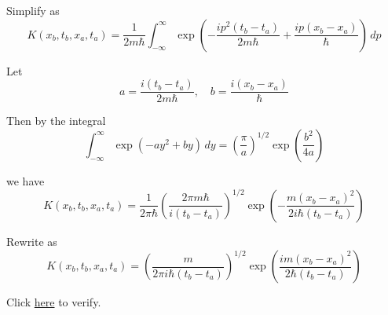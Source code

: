 Simplify as
\begin{equation*}
K(x_b,t_b,x_a,t_a)=\frac{1}{2m\hbar}\int_{-\infty}^\infty
\exp\left(-\frac{ip^2(t_b-t_a)}{2m\hbar}+\frac{ip(x_b-x_a)}{\hbar}\right)\,dp
\end{equation*}

Let
\begin{equation*}
a=\frac{i(t_b-t_a)}{2m\hbar},\quad b=\frac{i(x_b-x_a)}{\hbar}
\end{equation*}

Then by the integral
\begin{equation*}
\int_{-\infty}^\infty
\exp\left(-ay^2+by\right)\,dy=\left(\frac{\pi}{a}\right)^{1/2}\exp\left(\frac{b^2}{4a}\right)
\end{equation*}

we have
\begin{equation*}
K(x_b,t_b,x_a,t_a)=\frac{1}{2\pi\hbar}
\left(\frac{2\pi m\hbar}{i(t_b-t_a)}\right)^{1/2}
\exp\left(-\frac{m(x_b-x_a)^2}{2i\hbar(t_b-t_a)}\right)
\end{equation*}

Rewrite as
\begin{equation*}
K(x_b,t_b,x_a,t_a)=
\left(\frac{m}{2\pi i\hbar(t_b-t_a)}\right)^{1/2}
\exp\left(\frac{im(x_b-x_a)^2}{2\hbar(t_b-t_a)}\right)
\end{equation*}

Click \href{https://georgeweigt.github.io/blog/108.html}{here} to verify.


